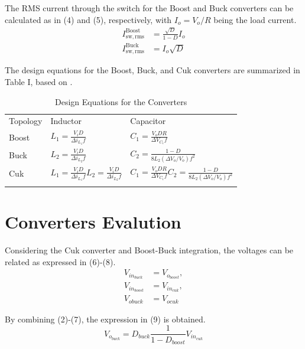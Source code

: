 \documentclass[10pt,conference]{IEEEtran}
\begin{document}
The RMS current through the switch for the Boost and Buck converters can be calculated as in (4) and (5), respectively, with $I_{o}=V_{o} / R$ being the load current.
\begin{equation}
\begin{aligned}
I_{\mathrm{sw}, \mathrm{rms}}^{\mathrm{Boost}} & =\frac{\sqrt{D}}{1-D} I_{o} \\
I_{\mathrm{sw}, \mathrm{rms}}^{\mathrm{Buck}} & =I_{o} \sqrt{D}
\end{aligned}
\label{eqn3}\end{equation}

The design equations for the Boost, Buck, and Cuk converters are summarized in Table I, based on \cite{bib17}.

\begin{table}
\caption[TABLE I:]{Design Equations for the Converters}\label{tbl1}
\begin{tabular}{|l|l|l|}
\toprule
Topology & Inductor & Capacitor \\
\colrule
Boost & $L_{1}=\frac{V_{i} D}{\Delta i_{L_{1}} f}$ & $C_{1}=\frac{V_{o} D R}{\Delta V_{C_{1}} f}$ \\
Buck & $L_{2}=\frac{V_{i} D}{\Delta i_{L_{2}} f}$ & $C_{2}=\frac{1-D}{8 L_{2}\left(\Delta V_{o} / V_{o}\right) f^{2}}$ \\
Cuk & $L_{1}=\frac{V_{i} D}{\Delta i_{L_{1}} f} L_{2}=\frac{V_{i} D}{\Delta i_{L_{2}} f}$ & $C_{1}=\frac{V_{o} D R}{\Delta V_{C_{1}} f} C_{2}=\frac{1-D}{8 L_{2}\left(\Delta V_{o} / V_{o}\right) f^{2}}$ \\
\botrule
\end{tabular}

\end{table}

\section[III]{Converters Evalution}
Considering the Cuk converter and Boost-Buck integration, the voltages can be related as expressed in (6)-(8).
\begin{equation}
\begin{aligned}
V_{i n_{b u c k}} & =V_{o_{b o o s t}}, \\
V_{i n_{b o o s t}} & =V_{i n_{c u k}}, \\
V_{o b u c k} & =V_{o c u k}
\end{aligned}
\label{eqn4}\end{equation}

By combining (2)-(7), the expression in (9) is obtained.
\begin{equation}
V_{o_{b u c k}}=D_{b u c k} \frac{1}{1-D_{b o o s t}} V_{i n_{c u k}}
\label{eqn5}\end{equation}
\end{document}

